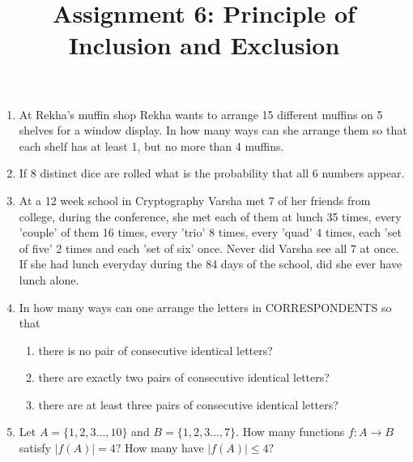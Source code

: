 \documentclass[a4paper]{article}
\title{Assignment 6: Principle of Inclusion and Exclusion}
\begin{document}
\maketitle
\begin{enumerate}



\item At Rekha's muffin shop Rekha wants to arrange 15 different muffins on 5 shelves for a window display.
	In how many ways can she arrange them so that each shelf has at least 1, but no more than 4 muffins. 

\item If 8 distinct dice are rolled what is the probability that all 6 numbers appear. 

\item At a 12 week school in Cryptography Varsha met 7 of her friends from college, during the conference, she met each of them at lunch 35 times, every 'couple' of them 16 times, every 'trio' 8 times, every 'quad' 4 times, each 'set of five' 2 times and each 'set of six' once. Never did Varsha see all 7 at once. If she had lunch everyday during the 84 days of the school, did she ever have lunch alone.

\item In how many ways can one arrange the letters in CORRESPONDENTS so that 
	\begin{enumerate} 
		\item there is no pair of consecutive identical letters?
		\item there are exactly two pairs of consecutive identical letters?
		\item there are at least three pairs of consecutive identical letters?
	\end{enumerate}
\item Let $A=\{1,2,3\dots, 10\}$ and $B=\{1,2,3\dots, 7\}$. How many functions $f:A\rightarrow B$ satisfy $|f(A)|=4$? How many have $|f(A)|\leq 4$?


\end{enumerate}
\end{document}
